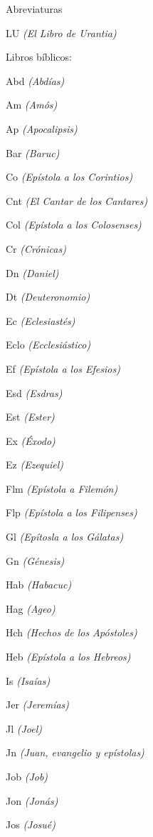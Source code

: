 \documentclass[twoside, 11pt]{book}
\begin{document}
\par {\huge Abreviaturas}
\bigbreak
\bigbreak
\begin{multicols}{2}
	\par LU \textit{(El Libro de Urantia)}
	\bigbreak
	\par Libros bíblicos:
	\bigbreak
	\par Abd \textit{(Abdías)}
	\par Am \textit{(Amós)}
	\par Ap \textit{(Apocalipsis)}
	\par Bar \textit{(Baruc)}
	\par Co \textit{(Epístola a los Corintios)}
	\par Cnt \textit{(El Cantar de los Cantares)}
	\par Col \textit{(Epístola a los Colosenses)}
	\par Cr \textit{(Crónicas)}
	\par Dn \textit{(Daniel)}
	\par Dt \textit{(Deuteronomio)}
	\par Ec \textit{(Eclesiastés)}
	\par Eclo \textit{(Ecclesiástico)}
	\par Ef \textit{(Epístola a los Efesios)}
	\par Esd \textit{(Esdras)}
	\par Est \textit{(Ester)}
	\par Ex \textit{(Éxodo)}
	\par Ez \textit{(Ezequiel)} 
	\par Flm \textit{(Epístola a Filemón)}
	\par Flp \textit{(Epístola a los Filipenses)}
	\par Gl \textit{(Epítosla a los Gálatas)}
	\par Gn \textit{(Génesis)}
	\par Hab \textit{(Habacuc)} 
	\par Hag \textit{(Ageo)}
	\par Hch \textit{(Hechos de los Apóstoles)}
	\par Heb \textit{(Epístola a los Hebreos)}
	\par Is \textit{(Isaías)}
	\par Jer \textit{(Jeremías)}
	\par Jl \textit{(Joel)}
	\par Jn \textit{(Juan, evangelio y epístolas)}
	\par Job \textit{(Job)}
	\par Jon \textit{(Jonás)}
	\par Jos \textit{(Josué)}

\end{multicols}
\end{document}
